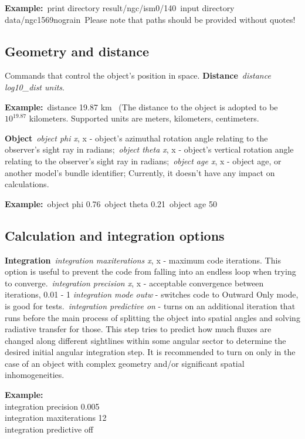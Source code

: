 \documentclass[a4paper]{article}
\begin{document}
    {\bf Example:}\
print directory result/ngc/ism0/140\
input directory data/ngc1569nograin\
Please note that paths should be provided without quotes!\

\subsection{Geometry and distance}
Commands that control the object's position in space.
    {\bf Distance}\
    {\it distance log10_dist units}.\

    {\bf Example:}\
distance 19.87 km \
(The distance to the object is adopted to be $10^{19.87}$ kilometers.
Supported units are meters, kilometers, centimeters.

    {\bf Object}\
    {\it object phi x}, x - object's azimuthal rotation angle relating to the observer's sight ray in radians;\
    {\it object theta x}, x - object's vertical rotation angle relating to the observer's sight ray in radians;\
    {\it object age x}, x - object age, or another model's bundle identifier; Currently, it doesn't have any impact on calculations.\

    {\bf Example:}\
object phi 0.76\
object theta 0.21\
object age 50\

\subsection{Calculation and integration options}
{\bf Integration}\
    {\it integration maxiterations x}, x - maximum code iterations. This option is useful to prevent the code from falling into an endless loop when trying to converge.\
    {\it integration precision x}, x - acceptable convergence between iterations, 0.01 - 1%
    {\it integration mode outw} - switches code to Outward Only mode, is good for tests.\
    {\it integration predictive on} - turns on an additional iteration that runs before the main process of splitting the object into spatial angles and solving
radiative transfer for those. This step tries to predict how much fluxes are changed along different sightlines within some angular sector
to determine the desired initial angular integration step. It is recommended to turn on only in the case of an object with complex geometry and/or
significant spatial inhomogeneities.

{\bf Example:}\\
integration precision 0.005\\
integration maxiterations 12\\
integration predictive off\\
\end{document}
